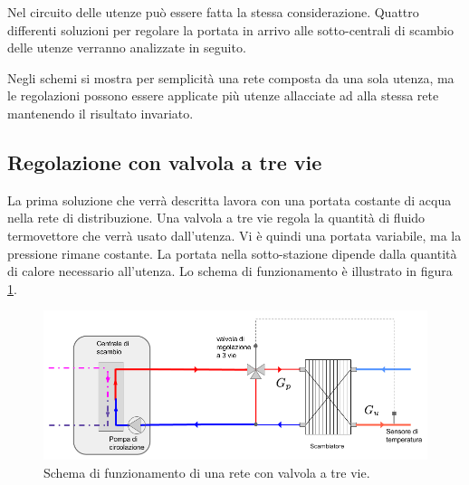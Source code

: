 \documentclass[laurea,oneside,11pt]{USiena_tesiLM}
\begin{document}
Nel circuito delle utenze può essere fatta la stessa considerazione. Quattro differenti soluzioni per regolare la portata in arrivo alle sotto-centrali di scambio delle utenze verranno analizzate in seguito.

Negli schemi si mostra per semplicità una rete composta da una sola utenza, ma le regolazioni possono essere applicate più utenze allacciate ad alla stessa rete mantenendo il risultato invariato.

\subsection{Regolazione con valvola a tre vie}
\label{subsec:3vie}
La prima soluzione che verrà descritta lavora con una portata costante di acqua nella rete di distribuzione. Una valvola a tre vie regola la quantità di fluido termovettore che verrà usato dall'utenza. Vi è quindi una portata variabile, ma la pressione rimane costante. La portata nella sotto-stazione dipende dalla quantità di calore necessario all'utenza.  Lo schema di funzionamento è illustrato in figura \ref{fig:3vie}.

\begin{figure}[!ht]
\centering
\includegraphics[width=\textwidth]{figure/3vie}
\caption{Schema di funzionamento di una rete con valvola a tre vie.}
\label{fig:3vie}

\end{figure}
\end{document}
